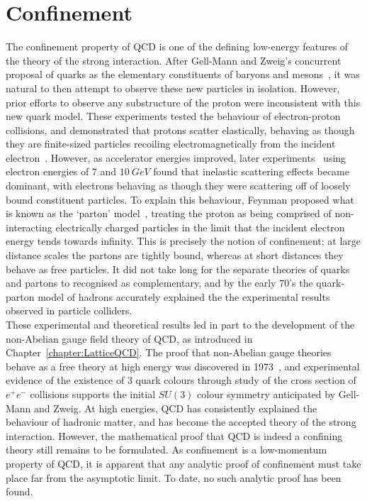 \section{Confinement}\label{sec:Confinement}
The confinement property of QCD is one of the defining low-energy features of the theory of the strong interaction. After Gell-Mann and Zweig's concurrent proposal of quarks as the elementary constituents of baryons and mesons~\cite{GellMann:1964nj,Zweig:1964jf}, it was natural to then attempt to observe these new particles in isolation. However, prior efforts to observe any substructure of the proton were inconsistent with this new quark model. These experiments tested the behaviour of electron-proton collisions, and demonstrated that protons scatter elastically, behaving as though they are finite-sized particles recoiling electromagnetically from the incident electron~\cite{Hofstadter:1956qs}. However, as accelerator energies improved, later experiments~\cite{Bloom:1969kc, Breidenbach:1969kd} using electron energies of $7$ and $10~\si{GeV}$ found that inelastic scattering effects became dominant, with electrons behaving as though they were scattering off of loosely bound constituent particles. To explain this behaviour, Feynman proposed what is known as the `parton' model~\cite{Feynman:1969ej}, treating the proton as being comprised of non-interacting electrically charged particles in the limit that the incident electron energy tends towards infinity. This is precisely the notion of confinement; at large distance scales the partons are tightly bound, whereas at short distances they behave as free particles. It did not take long for the separate theories of quarks and partons to recognised as complementary, and by the early 70's the quark-parton model of hadrons accurately explained the the experimental results observed in particle colliders.\\

These experimental and theoretical results led in part to the development of the non-Abelian gauge field theory of QCD, as introduced in Chapter~\ref{chapter:LatticeQCD}. The proof that non-Abelian gauge theories behave as a free theory at high energy was discovered in 1973~\cite{Gross:1973id}, and experimental evidence of the existence of 3 quark colours through study of the cross section of $e^+ e^-$ collisions supports the initial $SU(3)$ colour symmetry anticipated by Gell-Mann and Zweig. At high energies, QCD has consistently explained the behaviour of hadronic matter, and has become the accepted theory of the strong interaction. However, the mathematical proof that QCD is indeed a confining theory still remains to be formulated. As confinement is a low-momentum property of QCD, it is apparent that any analytic proof of confinement must take place far from the asymptotic limit. To date, no such analytic proof has been found.\\

